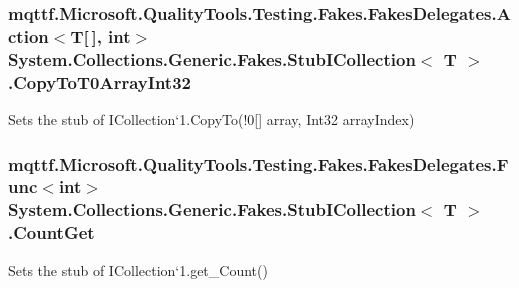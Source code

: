 \hypertarget{class_system_1_1_collections_1_1_generic_1_1_fakes_1_1_stub_i_collection_3_01_t_01_4_a33bc83a10b51b63094bf69048fb5c74c}{
\subsubsection[{Copy\-To\-T0\-Array\-Int32}]{\setlength{\rightskip}{0pt plus 5cm}mqttf.\-Microsoft.\-Quality\-Tools.\-Testing.\-Fakes.\-Fakes\-Delegates.\-Action$<$T\mbox{[}$\,$\mbox{]}, int$>$ System.\-Collections.\-Generic.\-Fakes.\-Stub\-I\-Collection$<$ T $>$.Copy\-To\-T0\-Array\-Int32}}\label{class_system_1_1_collections_1_1_generic_1_1_fakes_1_1_stub_i_collection_3_01_t_01_4_a33bc83a10b51b63094bf69048fb5c74c}


Sets the stub of I\-Collection`1.Copy\-To(!0\mbox{[}\mbox{]} array, Int32 array\-Index)

\hypertarget{class_system_1_1_collections_1_1_generic_1_1_fakes_1_1_stub_i_collection_3_01_t_01_4_abc2b3b13dff408f82c12926cc4d0f34f}{
\subsubsection[{Count\-Get}]{\setlength{\rightskip}{0pt plus 5cm}mqttf.\-Microsoft.\-Quality\-Tools.\-Testing.\-Fakes.\-Fakes\-Delegates.\-Func$<$int$>$ System.\-Collections.\-Generic.\-Fakes.\-Stub\-I\-Collection$<$ T $>$.Count\-Get}}\label{class_system_1_1_collections_1_1_generic_1_1_fakes_1_1_stub_i_collection_3_01_t_01_4_abc2b3b13dff408f82c12926cc4d0f34f}


Sets the stub of I\-Collection`1.get\-\_\-\-Count()

